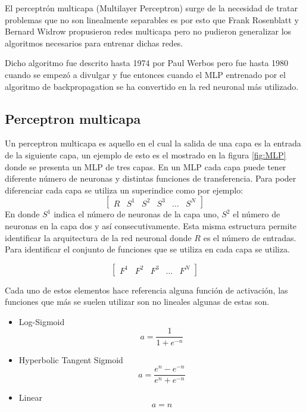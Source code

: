 \documentclass[12pt, titlepage]{article}
\begin{document}
El perceptrón multicapa (Multilayer Perceptron) surge de la necesidad de tratar problemas que no son linealmente separables es por esto que Frank Rosenblatt y Bernard Widrow propusieron redes multicapa pero no pudieron generalizar los algoritmos necesarios para entrenar dichas redes.

Dicho algoritmo fue descrito hasta 1974 por Paul Werbos pero fue hasta 1980 cuando se empezó a divulgar y fue entonces cuando el MLP entrenado por el algoritmo de backpropagation se ha convertido en la red neuronal más utilizado. \cite{libro1}
\subsection{Perceptron multicapa}
Un perceptron multicapa es aquello en el cual la salida de una capa es la entrada de la siguiente capa, un ejemplo de esto es el mostrado en la figura \ref{fig:MLP} donde se presenta un MLP de tres capas. En un MLP cada capa puede tener diferente número de neuronas y distintas funciones de transferencia. Para poder diferenciar cada capa se utiliza un superindice como por ejemplo:
\[ \begin{bmatrix} R & S^1 & S^2 & S^3 & \dots & S^N \end{bmatrix} \]
En donde $S^1$ indica el número de neuronas de la capa uno, $S^2$ el número de neuronas en la capa dos y así consecutivamente. Esta misma estructura permite identificar la arquitectura de la red neuronal donde $R$ es el número de entradas. Para identificar el conjunto de funciones que se utiliza en cada capa se utiliza.

\[ \begin{bmatrix} F^1 & F^2 & F^3 & \dots & F^N \end{bmatrix} \]

Cada uno de estos elementos hace referencia alguna función de activación, las funciones que más se suelen utilizar son no lineales algunas de estas son.

\begin{itemize}
    \item Log-Sigmoid
    \[ a = \dfrac{1}{1+e^{-n}}\]
    \item Hyperbolic Tangent Sigmoid
    \[ a = \dfrac{e^n - e^{-n}}{e^n + e^{-n}}\]
    \item Linear
    \[ a = n\]
\end{itemize}
\end{document}

